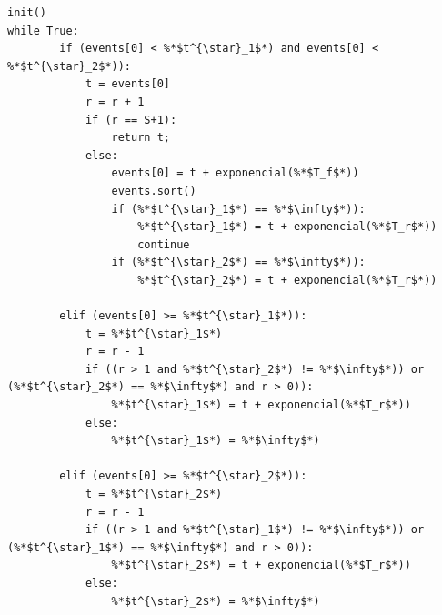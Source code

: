 \documentclass[10pt,a4paper]{article} %
\begin{document}
    \begin{lstlisting}[caption=Funciones auxiliares.]
init()
while True:
        if (events[0] < %*$t^{\star}_1$*) and events[0] < %*$t^{\star}_2$*)):
            t = events[0]
            r = r + 1
            if (r == S+1):
                return t;
            else:
                events[0] = t + exponencial(%*$T_f$*))
                events.sort()
                if (%*$t^{\star}_1$*) == %*$\infty$*)):
                    %*$t^{\star}_1$*) = t + exponencial(%*$T_r$*))
                    continue
                if (%*$t^{\star}_2$*) == %*$\infty$*)):
                    %*$t^{\star}_2$*) = t + exponencial(%*$T_r$*))

        elif (events[0] >= %*$t^{\star}_1$*)):
            t = %*$t^{\star}_1$*)
            r = r - 1
            if ((r > 1 and %*$t^{\star}_2$*) != %*$\infty$*)) or (%*$t^{\star}_2$*) == %*$\infty$*) and r > 0)):
                %*$t^{\star}_1$*) = t + exponencial(%*$T_r$*))
            else:
                %*$t^{\star}_1$*) = %*$\infty$*)

        elif (events[0] >= %*$t^{\star}_2$*)):
            t = %*$t^{\star}_2$*)
            r = r - 1
            if ((r > 1 and %*$t^{\star}_1$*) != %*$\infty$*)) or (%*$t^{\star}_1$*) == %*$\infty$*) and r > 0)):
                %*$t^{\star}_2$*) = t + exponencial(%*$T_r$*))
            else: 
                %*$t^{\star}_2$*) = %*$\infty$*)
    \end{lstlisting}
\end{document}
